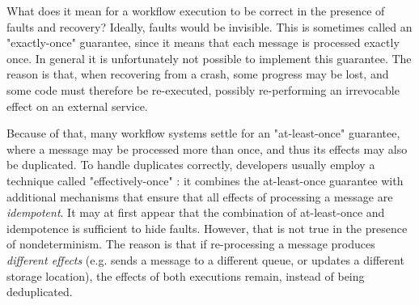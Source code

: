 What does it mean for a workflow execution to be correct in the presence of faults and recovery? Ideally, faults would be invisible. This is sometimes called an "exactly-once" guarantee, since it means that each message is processed exactly once. In general it is unfortunately not possible to implement this guarantee.
The reason is that, when recovering from a crash, some progress may be lost, and some code must therefore be re-executed, possibly re-performing an irrevocable effect on an external service.

Because of that, many workflow systems settle for an "at-least-once" guarantee, where a message may be processed more than once, and thus its effects may also be duplicated. To handle duplicates correctly, developers usually employ a technique called "effectively-once" \cite{effectively-once-pulsar,effectively-once-tweet}: it combines the at-least-once guarantee with additional  mechanisms that ensure that all effects of processing a message are \emph{idempotent}. It may at first appear that the combination of at-least-once and idempotence is sufficient to hide faults. However, that is not true in the presence of nondeterminism. The reason is that if re-processing a message produces \emph{different effects} (e.g. sends a message to a different queue, or updates a different storage location), the effects of both executions remain, instead of being deduplicated.
%

